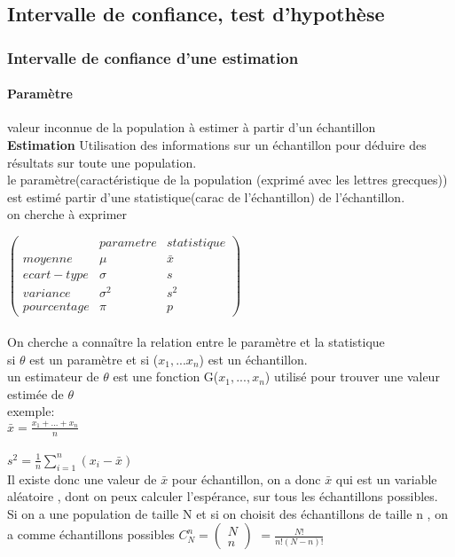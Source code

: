 \documentclass{article}
\begin{document}
\subsection{Intervalle de confiance, test d'hypothèse}
\subsubsection{Intervalle de confiance d'une estimation} 
\paragraph{Paramètre}
valeur inconnue de la population à estimer à partir d'un échantillon\\\textbf{Estimation} Utilisation des informations sur un échantillon pour déduire des résultats sur toute une population.\\le paramètre(caractéristique de la population (exprimé avec les lettres grecques)) est estimé partir d'une statistique(carac de l'échantillon) de l'échantillon.\\on cherche à exprimer\\
\begin{center}

$\begin{pmatrix}
 & parametre & statistique \\
 moyenne & \mu & \bar{x} \\
 ecart-type & \sigma & s \\
 variance & \sigma^2 & s^2 \\
 pourcentage & \pi & p
\end{pmatrix}$

\end{center}
\paragraph{} On cherche a connaître la relation entre le paramètre et la statistique\\si $\theta$ est un paramètre et si ($x_1,...x_n$) est un échantillon.\\un estimateur de $\theta$ est une fonction G($x_1,...,x_n$) utilisé pour trouver une valeur estimée de $\theta$\\exemple: \\
$\bar{x} = \frac{x_1+...+x_n}{n}$\\\\

$s^2 = \frac{1}{n} \sum_{i=1}^n (x_i -  \bar{x})$\\
Il existe donc une valeur de $\bar{x}$ pour échantillon, on a donc $\bar{x}$ qui est un variable aléatoire , dont on peux calculer l'espérance, sur tous les échantillons possibles.\\
Si on a une population de taille N et si on choisit des échantillons de taille n , on a comme échantillons possibles $C_N^n = \begin{pmatrix}
N \\ n
\end{pmatrix}$ $=\frac{N!}{n!(N-n)!}$
\end{document}
